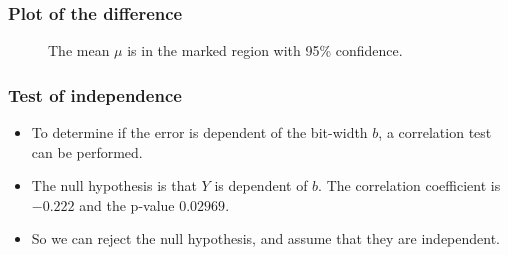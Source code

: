 \documentclass[serif, 12pt]{beamer}
\begin{document}
\begin{frame}

\frametitle{Plot of the difference}

\begin{figure}[h]
	\caption{The mean $\mu$ is in the marked region with 95\% confidence.}
	\label{fig:errhh}
\end{figure}

\end{frame}


\begin{frame}

\frametitle{Test of independence}

\begin{itemize}

\item To determine if the error is dependent of the bit-width $b$, a correlation 
test can be performed.

\item The null hypothesis is that $Y$ is dependent of $b$. The correlation 
coefficient is $-0.222$ and the p-value $0.02969$.

\item So we can reject the null hypothesis, and assume that they are 
independent.
\end{itemize}

\end{frame}

\end{document}
